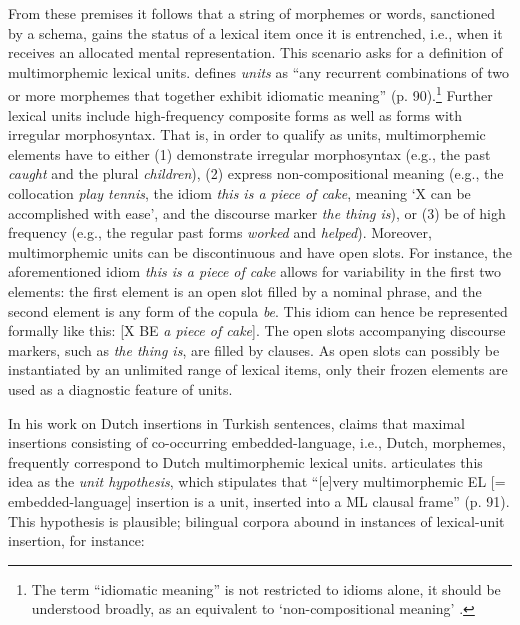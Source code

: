 From these premises it follows that a string of morphemes or words, sanctioned by a schema, gains the status of a lexical item once it is entrenched, i.e., when it receives an allocated mental representation. This scenario asks for a definition of multimorphemic lexical units. \citet{backus-units-2003} defines \textit{units} as ``any recurrent combinations of two or more morphemes that together exhibit idiomatic meaning'' (p. 90).\footnote{The term ``idiomatic meaning'' is not restricted to idioms alone, it should be understood broadly, as an equivalent to `non-compositional meaning' \citep[cf.][86]{backus-units-2003}.} Further lexical units include high-frequency composite forms as well as forms with irregular morphosyntax. That is, in order to qualify as units, multimorphemic elements have to either (1) demonstrate irregular morphosyntax (e.g., the past \textit{caught} and the plural \textit{children}), (2) express non-compositional meaning (e.g., the collocation \textit{play tennis}, the idiom \textit{this is a piece of cake}, meaning `X can be accomplished with ease', and the discourse marker \textit{the thing is}), or (3) be of high frequency (e.g., the regular past forms \textit{worked} and \textit{helped}). Moreover, multimorphemic units can be discontinuous and have open slots. For instance, the aforementioned idiom \textit{this is a piece of cake} allows for variability in the first two elements: the first element is an open slot filled by a nominal phrase, and the second element is any form of the copula \textit{be}. This idiom can hence be represented formally like this: [X BE \textit{a piece of cake}]. The open slots accompanying discourse markers, such as \textit{the thing is}, are filled by clauses. As open slots can possibly be instantiated by an unlimited range of lexical items, only their frozen elements are used as a diagnostic feature of units.

\begin{sloppypar}
In his work on Dutch insertions in Turkish sentences, \citet{backus-evidence-1999} claims that maximal insertions consisting of co-occurring embedded-language, i.e., Dutch, morphemes, frequently correspond to Dutch multimorphemic lexical units. \citet{backus-units-2003} articulates this idea as the \textit{unit hypothesis}, which stipulates that ``[e]very multimorphemic EL [= embedded-language] insertion is a unit, inserted into a ML clausal frame'' (p. 91). This hypothesis is plausible; bilingual corpora abound in instances of lexical-unit insertion, for instance:
\end{sloppypar}

